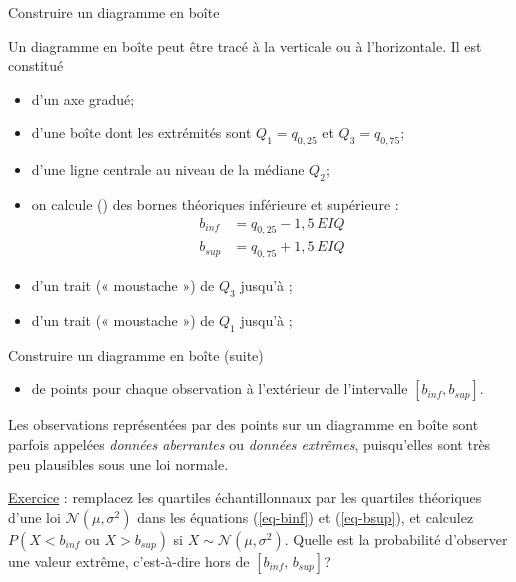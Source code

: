 \documentclass{BeamerTemplate}
\newcommand{\cibleReponse}{}
\newcommand{\lienreponse}[1]{\gdef\cibleReponse{#1}}
\begin{document}
\begin{frame}[t]{Construire un diagramme en boîte}

{\small
Un diagramme en boîte peut être tracé à la verticale ou à l'horizontale. Il est constitué
\begin{itemize}
\item<1-> d'un axe gradué;
\item<2-> d'une boîte dont les extrémités sont $Q_1=q_{0,25}$ et $Q_3=q_{0,75}$;
\item<2-> d'une ligne centrale au niveau de la médiane $Q_2$;
\item<3-> on calcule () des bornes théoriques inférieure et supérieure :
\begin{align}
b_{inf}&=q_{0,25}-1,5\,EIQ\label{eq-binf}\\
b_{sup}&=q_{0,75}+1,5\,EIQ\label{eq-bsup}
\end{align}
\item<3-> d'un trait (« moustache ») de $Q_3$ jusqu'à ;
\item<3-> d'un trait (« moustache ») de $Q_1$ jusqu'à ;
\end{itemize}
}
\end{frame}


\begin{frame}[t,label=exbornes]{Construire un diagramme en boîte (suite)}

{\small
\begin{itemize}
\item<1-> de points pour chaque observation à l'extérieur de l'intervalle $[b_{inf},b_{sup}]$.
\end{itemize}
Les observations représentées par des points sur un diagramme en boîte sont parfois appelées
\textit{données aberrantes} ou \textit{données extrêmes}, puisqu'elles sont très peu plausibles sous une
loi normale.

\bigskip
\underline{Exercice} : remplacez les quartiles échantillonnaux par les quartiles théoriques d'une loi
$\mathcal{N}(\mu,\sigma^2)$ dans les équations (\ref{eq-binf}) et (\ref{eq-bsup}), et calculez
$P(X<b_{inf}\text{\ ou\ }X>b_{sup})$ si $X\sim \mathcal{N}(\mu,\sigma^2)$. Quelle est la probabilité
d'observer une valeur extrême, c'est-à-dire hors de $[b_{inf}, \, b_{sup}]$?
}
\lienreponse{rep-ex}
\end{frame}
\end{document}
